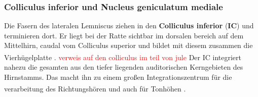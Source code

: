 \documentclass[12pt,a4paper,pdftex]{article}
\begin{document}

\subsubsection*{Colliculus inferior und Nucleus geniculatum mediale}

Die Fasern des lateralen Lemniscus ziehen in den \textbf{Colliculus inferior} (\textbf{IC}) und terminieren dort. Er liegt bei der Ratte sichtbar im dorsalen bereich auf dem Mittelhirn, caudal vom Colliculus superior und bildet mit diesem zusammen die Vierhügelplatte \textsuperscript{\cite[29]{paxinos2014rat}}. \textcolor{red}{verweis auf den colliculus im teil von jule} 
Der IC integriert nahezu die gesamten aus den tiefer liegenden auditorischen Kerngebieten des Hirnstamms. Das macht ihn zu einem großen Integrationszentrum für die verarbeitung des Richtungshören und auch für Tonhöhen \textsuperscript{\cite[29]{paxinos2014rat}}.
\end{document}
